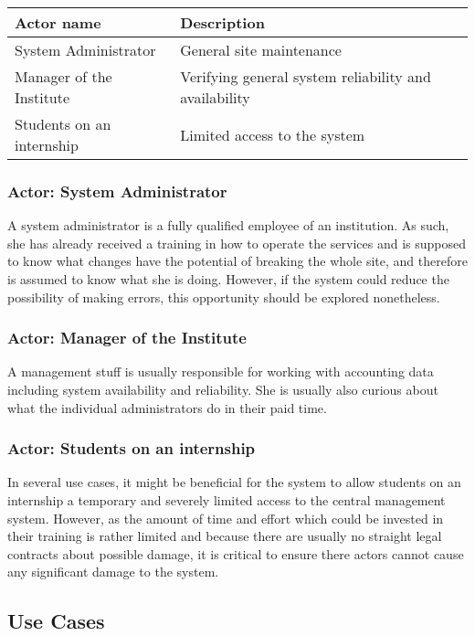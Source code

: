 \documentclass[12pt]{article}
\begin{document}
\begin{center}
	\begin{tabular}{| p{5.5cm} | p{9.5cm} |}
		\hline
		\textbf{Actor name}		& \textbf{Description}\\
		\hline
		System Administrator	& General site maintenance\\
		\hline
		Manager of the Institute	& Verifying general system reliability and availability\\
		\hline
		Students on an internship	& Limited access to the system\\
		\hline
	\end{tabular}
	\label{tab:Actors}
\end{center}

\subsubsection{Actor: System Administrator}
A system administrator is a fully qualified employee of an institution.  As
such, she has already received a training in how to operate the services and is
supposed to know what changes have the potential of breaking the whole site, and
therefore is assumed to know what she is doing.  However, if the system could
reduce the possibility of making errors, this opportunity should be explored
nonetheless.

\subsubsection{Actor: Manager of the Institute}
A management stuff is usually responsible for working with accounting data
including system availability and reliability.  She is usually also curious
about what the individual administrators do in their paid time.

\subsubsection{Actor: Students on an internship}
In several use cases, it might be beneficial for the system to allow students on
an internship a temporary and severely limited access to the central management
system.  However, as the amount of time and effort which could be invested in
their training is rather limited and because there are usually no straight legal
contracts about possible damage, it is critical to ensure there actors cannot
cause any significant damage to the system.

\subsection{Use Cases}
\end{document}
